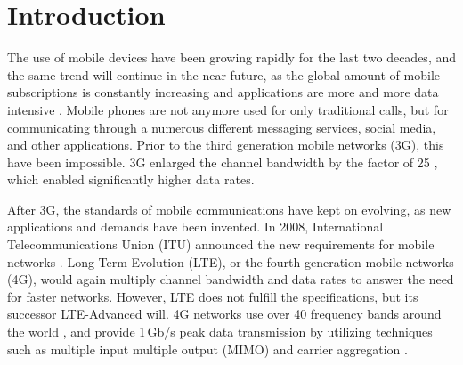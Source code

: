 \section{Introduction}
\label{sec:introduction}

\thispagestyle{empty}

\begin{comment}
\begin{itemize}
\item[--]Tutkimuksen taustaa ja tutkimusaiheen yleisluonteinen esittely
\item[--]Tutkimuksen tavoitteet
\item[--]Pääkysymys ja osaongelmat
\item[--]Tutkimuksen rajaus ja keskeiset käsitteet.
\item[--]Työn rakenne
\end{itemize}
\end{comment}

The use of mobile devices have been growing rapidly for the last two decades, and the same trend will continue in the near future, as the global amount of mobile subscriptions is constantly increasing and applications are more and more data intensive \cite{nokia,cisco,ericsson,gsma}. Mobile phones are not anymore used for only traditional calls, but for communicating through a numerous different messaging services, social media, and other applications. Prior to the third generation mobile networks (3G), this have been impossible. 3G enlarged the channel bandwidth by the factor of 25 \cite{molisch}, which enabled significantly higher data rates.

After 3G, the standards of mobile communications have kept on evolving, as new applications and demands have been invented. In 2008, International Telecommunications Union (ITU) announced the new requirements for mobile networks \cite{itur}. Long Term Evolution (LTE), or the fourth generation mobile networks (4G), would again multiply channel bandwidth and data rates to answer the need for faster networks. However, LTE does not fulfill the specifications, but its successor LTE-Advanced will. 4G networks use over 40 frequency bands around the world \cite{radio_electronics,molisch}, and provide 1\,Gb/s peak data transmission by utilizing techniques such as multiple input multiple output (MIMO) and carrier aggregation \cite{parkvall_lte}.

